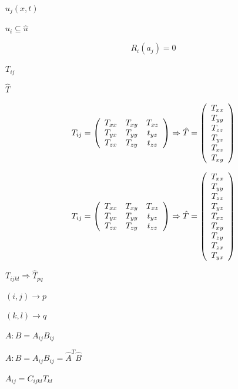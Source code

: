 \documentclass{article}
\begin{document}
$ \hat{u}_j(x, t)  \qquad $
\pagebreak

$ \hat{u}_i \subseteq \hat{u} $
\pagebreak

\[ R_i(a_j) = 0 \]
\pagebreak

$ T_{ij} $
\pagebreak

$ 
\hat{T} $
\pagebreak

\[
T_{ij} = \left( \begin{array}{ccc}
T_{xx} & T_{xy} & T_{xz} \\
T_{yx} & T_{yy} & t_{yz} \\
T_{zx} & T_{zy} & t_{zz} \end{array} \right) \Rightarrow \\
\hat{T} = \left( \begin{array}{c}
T_{xx} \\ T_{yy} \\ T_{zz} \\ T_{yz} \\ T_{xz} \\ T_{xy} \end{array} \right)
\]
\pagebreak

\[
T_{ij} = \left( \begin{array}{ccc}
T_{xx} & T_{xy} & T_{xz} \\
T_{yx} & T_{yy} & t_{yz} \\
T_{zx} & T_{zy} & t_{zz} \end{array} \right) \Rightarrow \\
\hat{T} = \left( \begin{array}{c}
T_{xx} \\ T_{yy} \\ T_{zz} \\ T_{yz} \\ T_{xz} \\ T_{xy} \\ T_{zy} \\ T_{zx} \\ T_{yx} \end{array} \right)
\]
\pagebreak

$ T_{ijkl} \Rightarrow \hat{T}_{pq} $
\pagebreak

$ (i,j) \rightarrow p $
\pagebreak

$ (k,l)\rightarrow q $
\pagebreak

$ A:B = A_{ij}B_{ij} $
\pagebreak

$ A:B = A_{ij}B_{ij} = \hat{A}^T \hat{B} $
\pagebreak

$ 
A_{ij} = C_{ijkl}T_{kl} $
\pagebreak
\end{document}
